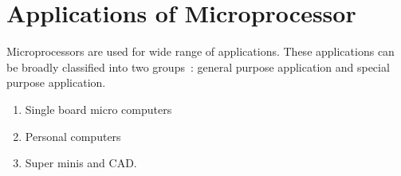 \section{Applications of Microprocessor}\label{sec7.10}

Microprocessors are used for wide range of applications. These applications can be broadly classified into two groups~: general purpose application and special purpose application.

\medskip
{}
\begin{enumerate}
\renewcommand{\labelenumi}{$\surd$}
\item Single board micro computers

\item Personal computers

\item Super minis and CAD.
\end{enumerate}


